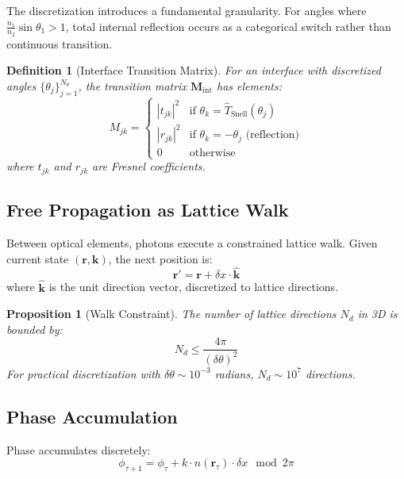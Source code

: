 \documentclass[twocolumn,10pt,a4paper]{article}
\newtheorem{proposition}[theorem]{Proposition}
\newtheorem{definition}[theorem]{Definition}
\begin{document}
The discretization introduces a fundamental granularity. For angles where $\frac{n_1}{n_2} \sin\theta_1 > 1$, total internal reflection occurs as a categorical switch rather than continuous transition.

\begin{definition}[Interface Transition Matrix]
For an interface with discretized angles $\{\theta_j\}_{j=1}^{N_\theta}$, the transition matrix $\mathbf{M}_{\text{int}}$ has elements:
\begin{equation}
M_{jk} = \begin{cases}
|t_{jk}|^2 & \text{if } \theta_k = \hat{T}_{\text{Snell}}(\theta_j) \\
|r_{jk}|^2 & \text{if } \theta_k = -\theta_j \text{ (reflection)} \\
0 & \text{otherwise}
\end{cases}
\end{equation}
where $t_{jk}$ and $r_{jk}$ are Fresnel coefficients.
\end{definition}

\subsection{Free Propagation as Lattice Walk}

Between optical elements, photons execute a constrained lattice walk. Given current state $(\mathbf{r}, \mathbf{k})$, the next position is:
\begin{equation}
\mathbf{r}' = \mathbf{r} + \delta x \cdot \hat{\mathbf{k}}
\end{equation}
where $\hat{\mathbf{k}}$ is the unit direction vector, discretized to lattice directions.

\begin{proposition}[Walk Constraint]
The number of lattice directions $N_d$ in 3D is bounded by:
\begin{equation}
N_d \leq \frac{4\pi}{(\delta\theta)^2}
\end{equation}
For practical discretization with $\delta\theta \sim 10^{-3}$ radians, $N_d \sim 10^7$ directions.
\end{proposition}

\subsection{Phase Accumulation}

Phase accumulates discretely:
\begin{equation}
\phi_{\tau+1} = \phi_\tau + k \cdot n(\mathbf{r}_\tau) \cdot \delta x \mod 2\pi
\end{equation}
\end{document}
